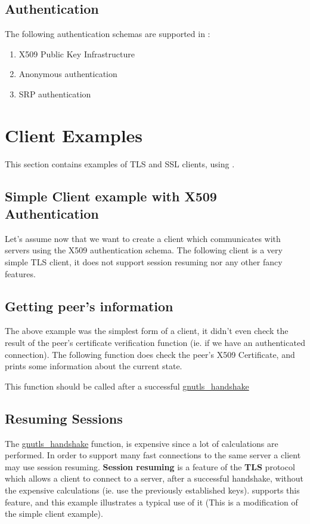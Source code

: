 \documentclass{book}
\begin{document}
\subsection{Authentication}
\par
The following authentication schemas are supported in \gnutls:
\begin{enumerate}
 \item X509 Public Key Infrastructure
 \item Anonymous authentication
 \item SRP authentication
\end{enumerate}



\section{Client Examples}
This section contains examples of TLS and SSL clients, using \gnutls. 

\subsection{Simple Client example with X509 Authentication}
Let's assume now that we want to create a client which communicates
with servers using the X509 authentication schema. The following client
is a very simple TLS client, it does not support session resuming nor
any other fancy features.


\subsection{Getting peer's information}
\par The above example was the simplest form of a client, it didn't even check
the result of the peer's certificate verification function (ie. if we have
an authenticated connection). The following function does check the peer's X509
Certificate, and prints some information about the current state.
\par
This function should be called after a successful
\hyperref{gnutls\_handshake()}{gnutls\_handshake() (see Section }{ for more information)}{gnutls_handshake}



\subsection{Resuming Sessions}
\par
The 
\hyperref{gnutls\_handshake()}{gnutls\_handshake() (see Section }{ for more information)}{gnutls_handshake}
 function, is expensive since
a lot of calculations are performed. In order to support many fast connections to
the same server a client may use session resuming. {\bf Session resuming} is a
feature of the {\bf TLS} protocol which allows a client to connect to a server,
after a successful handshake, without the expensive calculations (ie. use the previously
established keys). \gnutls supports this feature, and this example illustrates a
typical use of it (This is a modification of the simple client example).
\end{document}
